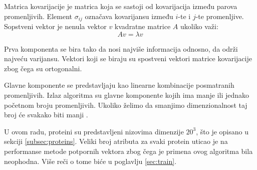 Matrica kovarijacije je matrica koja se sastoji od kovarijacija između parova promenljivih. Element $\sigma_{ij}$ označava kovarijansu između $i$-te i $j$-te promenljive. Sopstveni vektor je nenula vektor $v$ kvadratne matrice $A$ ukoliko važi:
$$Av = \lambda v$$

\noindent Prva komponenta se bira tako da nosi najviše informacija odnosno, da održi najveću varijansu. Vektori koji se biraju su spostveni vektori matrice kovarijacije zbog čega su ortogonalni.

Glavne komponente se predstavljaju kao linearne kombinacije posmatranih promenljivih. Izlaz algoritma su glavne komponente kojih ima manje ili jednako početnom broju promenljivih. Ukoliko želimo da smanjimo dimenzionalnost taj broj će svakako biti manji \cite{pcaOnl}.


U ovom radu, proteini su predstavljeni nizovima dimenzije $20^3$, što je opisano u sekciji \ref{subsec:proteins}. Veliki broj atributa za svaki protein uticao je na performanse metode potpornih vektora zbog čega je primena ovog algoritma bila neophodna. Više reči o tome biće u poglavlju \ref{sec:train}.


